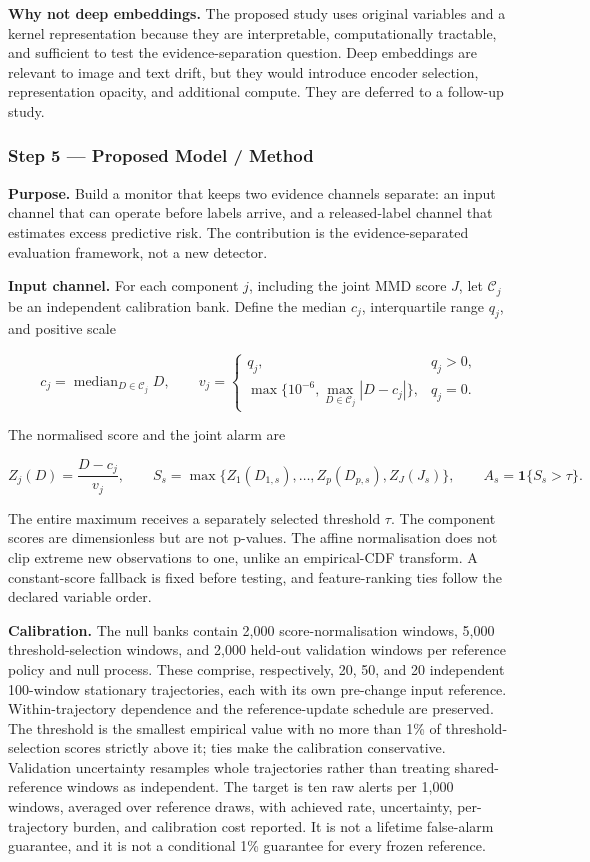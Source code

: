 \documentclass[
]{article}
\begin{document}
\textbf{Why not deep embeddings.} The proposed study uses original
variables and a kernel representation because they are interpretable,
computationally tractable, and sufficient to test the
evidence-separation question. Deep embeddings are relevant to image and
text drift, but they would introduce encoder selection, representation
opacity, and additional compute. They are deferred to a follow-up study.

\hypertarget{step-5-proposed-model-method}{%
\subsubsection{Step 5 --- Proposed Model /
Method}\label{step-5-proposed-model-method}}

\textbf{Purpose.} Build a monitor that keeps two evidence channels
separate: an input channel that can operate before labels arrive, and a
released-label channel that estimates excess predictive risk. The
contribution is the evidence-separated evaluation framework, not a new
detector.

\textbf{Input channel.} For each component \(j\), including the joint
MMD score \(J\), let \(\mathcal{C}_j\) be an independent calibration
bank. Define the median \(c_j\), interquartile range \(q_j\), and
positive scale

\[
c_j=\operatorname{median}_{D\in\mathcal{C}_j}D,
\qquad
v_j=
\begin{cases}
q_j, & q_j>0,\\
\max\{10^{-6},\max_{D\in\mathcal{C}_j}|D-c_j|\}, & q_j=0.
\end{cases}
\]

The normalised score and the joint alarm are

\[
Z_j(D)=\frac{D-c_j}{v_j},
\qquad
S_s=\max\{Z_1(D_{1,s}),\ldots,Z_p(D_{p,s}),Z_J(J_s)\},
\qquad
A_s=\mathbf{1}\{S_s>\tau\}.
\]

The entire maximum receives a separately selected threshold \(\tau\).
The component scores are dimensionless but are not p-values. The affine
normalisation does not clip extreme new observations to one, unlike an
empirical-CDF transform. A constant-score fallback is fixed before
testing, and feature-ranking ties follow the declared variable order.

\textbf{Calibration.} The null banks contain 2,000 score-normalisation
windows, 5,000 threshold-selection windows, and 2,000 held-out
validation windows per reference policy and null process. These
comprise, respectively, 20, 50, and 20 independent 100-window stationary
trajectories, each with its own pre-change input reference.
Within-trajectory dependence and the reference-update schedule are
preserved. The threshold is the smallest empirical value with no more
than 1\% of threshold-selection scores strictly above it; ties make the
calibration conservative. Validation uncertainty resamples whole
trajectories rather than treating shared-reference windows as
independent. The target is ten raw alerts per 1,000 windows, averaged
over reference draws, with achieved rate, uncertainty, per-trajectory
burden, and calibration cost reported. It is not a lifetime false-alarm
guarantee, and it is not a conditional 1\% guarantee for every frozen
reference.
\end{document}
